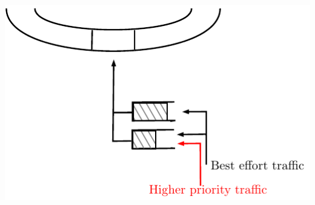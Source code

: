 \documentclass[a4paper,10pt]{article}
\begin{document}
\begin{center}   

      \includegraphics[scale=0.7]{insertion1.pdf}

  
\end{center}
 
 
\end{document}
